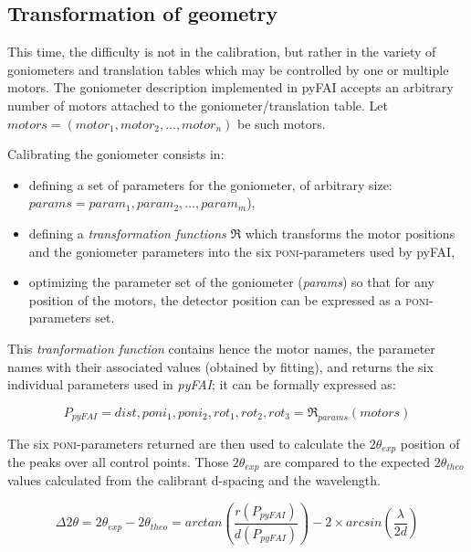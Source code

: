 \documentclass[preprint, pdf]{iucr}              %
\begin{document}
\subsection{Transformation of geometry}

This time, the difficulty is not in the calibration, but  rather in the
variety of goniometers and translation tables which may be controlled by one or multiple
motors.
The goniometer description implemented in pyFAI accepts an
arbitrary number of motors attached to the goniometer/translation table. 
Let $motors = (motor_1, motor_2, \ldots, motor_n)$ be such motors. 

Calibrating the goniometer consists in:
\begin{itemize}
  \item defining a set of parameters for the goniometer, of arbitrary size:
  $params = param_1, param_2, \ldots, param_m$),
  \item defining a \textit{transformation functions} $\Re$ which transforms the motor positions
  and the goniometer parameters into the six \textsc{poni}-parameters used by
  pyFAI,
  \item optimizing the parameter set of the goniometer (\textit{params}) so that
  for any position of the motors, the detector position can be expressed as
  a \textsc{poni}-parameters set.
\end{itemize}

This \textit{tranformation function} contains hence the motor names, the
parameter names with their associated values (obtained by fitting), and returns
the six individual parameters used in \textit{pyFAI}; it can be formally
expressed as:

\begin{equation}
P_{pyFAI} = dist, poni_1, poni_2, rot_1, rot_2, rot_3 = \Re_{params}(motors)
\end{equation}


The six \textsc{poni}-parameters returned 
are then used to
calculate the $2\theta_{exp}$ position of the peaks over all control
points.
Those $2\theta_{exp}$ are compared to
the expected $2\theta_{theo}$ values calculated from the calibrant d-spacing and
the wavelength.

$$
\Delta 2\theta = 2\theta _{exp} - 2\theta _{theo} =
arctan(\frac{r(P_{pyFAI})}{d(P_{pyFAI})}) -  2 \times
arcsin(\frac{\lambda}{2d})
$$
\end{document}
